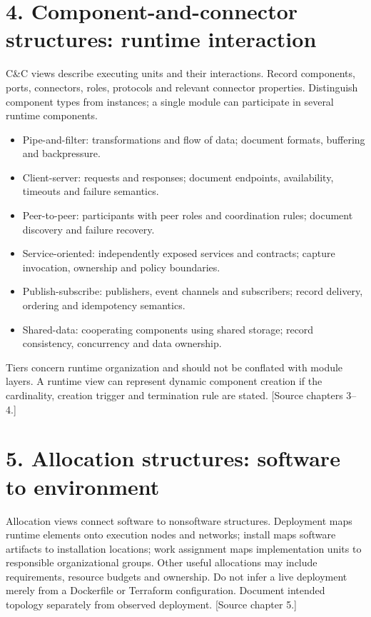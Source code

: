 \documentclass[11pt,letterpaper]{article}
\begin{document}
\section*{4. Component-and-connector structures: runtime interaction}
C\&C views describe executing units and their interactions. Record components, ports, connectors, roles, protocols and relevant connector properties. Distinguish component types from instances; a single module can participate in several runtime components.\par\smallskip
\begin{itemize}
\item Pipe-and-filter: transformations and flow of data; document formats, buffering and backpressure.
\item Client-server: requests and responses; document endpoints, availability, timeouts and failure semantics.
\item Peer-to-peer: participants with peer roles and coordination rules; document discovery and failure recovery.
\item Service-oriented: independently exposed services and contracts; capture invocation, ownership and policy boundaries.
\item Publish-subscribe: publishers, event channels and subscribers; record delivery, ordering and idempotency semantics.
\item Shared-data: cooperating components using shared storage; record consistency, concurrency and data ownership.
\end{itemize}
Tiers concern runtime organization and should not be conflated with module layers. A runtime view can represent dynamic component creation if the cardinality, creation trigger and termination rule are stated. [Source chapters 3--4.]\par\smallskip
\section*{5. Allocation structures: software to environment}
Allocation views connect software to nonsoftware structures. Deployment maps runtime elements onto execution nodes and networks; install maps software artifacts to installation locations; work assignment maps implementation units to responsible organizational groups. Other useful allocations may include requirements, resource budgets and ownership. Do not infer a live deployment merely from a Dockerfile or Terraform configuration. Document intended topology separately from observed deployment. [Source chapter 5.]\par\smallskip
\end{document}
